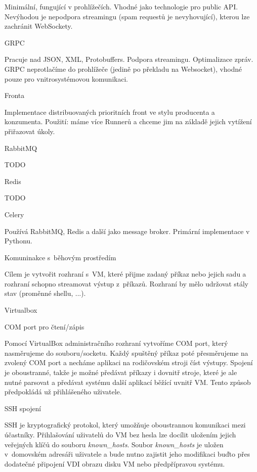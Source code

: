Minimální, fungující v prohlížečích.
Vhodné jako technologie pro public API.
Nevýhodou je nepodpora streamingu (spam requestů je nevyhovující), kterou lze zachránit WebSockety.

\secc GRPC

Pracuje nad JSON, XML, Protobuffers.
Podpora streamingu.
Optimalizace zpráv.
GRPC neprotlačíme do prohlížeče (jedině po překladu na Websocket), vhodné pouze pro vnitrosystémovou komunikaci.


\sec Fronta

Implementace distribuovaných prioritních front ve stylu producenta a konzumenta.
Použití: máme více Runnerů a chceme jim na základě jejich vytížení přiřazovat úkoly.

\secc RabbitMQ

TODO

\secc Redis

TODO

\secc Celery

Používá RabbitMQ, Redis a další jako message broker. 
Primární implementace v Pythonu.

\sec Komuninakce s~běhovým prostředím

Cílem je vytvořit rozhraní s~VM, které přijme zadaný příkaz nebo jejich sadu a rozhraní schopno streamovat výstup z~příkazů.
Rozhraní by mělo udržovat stály stav (proměnné shellu, ...).

\secc Virtualbox

\seccc COM port pro čtení/zápis

Pomocí VirtualBox administračního rozhraní vytvoříme COM port, který nasměrujeme do souboru/socketu.
Každý spuštěný příkaz poté přesměrujeme na zvolený COM port a necháme aplikaci na rodičovském stroji číst výstupy.
Spojení je oboustranné, takže je možné předávat příkazy i dovnitř stroje, které je ale nutné parsovat a předávat systému další aplikací běžící uvnitř VM.
Tento způsob předpokládá už přihlášeného uživatele.

\seccc SSH spojení

SSH je kryptografický protokol, který umožňuje oboustrannou komunikaci mezi účastníky.
Přihlašování uživatelů do VM bez hesla lze docílit uložením jejich veřejných klíčů do souboru {\it known\_hosts}.
Soubor {\it known\_hosts} je uložen v~domovském adresáři uživatele a bude nutno zajistit jeho modifikaci buďto přes dodatečné připojení VDI obrazu disku VM nebo předpřípravou systému.

